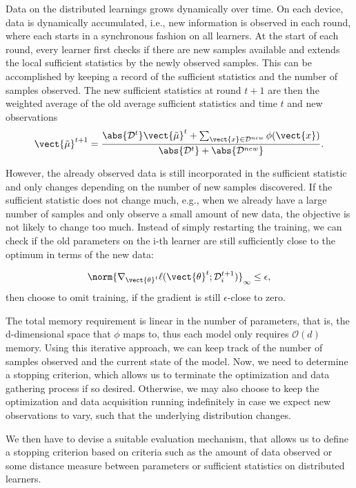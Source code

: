Data on the distributed learnings grows dynamically over time.
On each device, data is dynamically accumulated, i.e., new information is observed in each round, where each starts in a synchronous fashion on all learners.
At the start of each round, every learner first checks if there are new samples available and extends the local sufficient statistics by the newly observed samples.
This can be accomplished by keeping a record of the sufficient statistics and the number of samples observed.
The new sufficient statistics at round $t+1$ are then the weighted average of the old average sufficient statistics and time $t$ and new observations 
\begin{equation}
    \vect{\tilde{\mu}}^{t+1} = \frac{\abs{\mathcal{D}^{t}}\vect{\tilde{\mu}}^t + \sum_{\vect{x} \in \mathcal{D}^{new}} \phi(\vect{x})}{\abs{\mathcal{D}^{t}} + \abs{\mathcal{D}^{new}}}.
\end{equation}

However, the already observed data is still incorporated in the sufficient statistic and only changes depending on the number of new samples discovered.
If the sufficient statistic does not change much, e.g., when we already have a large number of samples and only observe a small amount of new data, the objective is not likely to change too much. 
Instead of simply restarting the training, we can check if the old parameters on the i-th learner are still sufficiently close to the optimum in terms of the new data: 

\begin{equation}
    \norm{\nabla_{\vect{\theta}^t} \ell(\vect{\theta}^{t} ; \mathcal{D}_i^{t+1})}_{\infty} \leq \epsilon,
\end{equation}
then choose to omit training, if the gradient is still $\epsilon$-close to zero.

The total memory requirement is linear in the number of parameters, that is, the d-dimensional space that $\phi$ maps to, thus each model only requires $\mathcal{O}(d)$ memory.
Using this iterative approach, we can keep track of the number of samples observed and the current state of the model.
Now, we need to determine a stopping criterion, which allows us to terminate the optimization and data gathering process if so desired. 
Otherwise, we may also choose to keep the optimization and data acquisition running indefinitely in case we expect new observations to vary, such that the underlying distribution changes.

We then have to devise a suitable evaluation mechanism, that allows us to define a stopping criterion based on criteria such as the amount of data observed or some distance measure between parameters or sufficient statistics on distributed learners.

